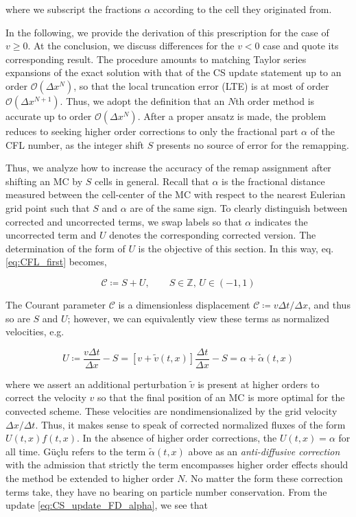 \documentclass[11pt,titlepage]{report}
\begin{document}
\noindent where we subscript the fractions $\alpha$ according to the cell they originated from. 

In the following, we provide the derivation of this prescription for the case of $v \geq 0$. At the conclusion, we discuss differences for the  $v < 0$ case and quote its corresponding result. The procedure amounts to matching Taylor series expansions of the exact solution with that of the CS update statement up to an order $\mathcal{O}(\Delta x^N)$, so that the local truncation error (LTE) is at most of order $\mathcal{O}(\Delta x^{N+1})$. Thus, we adopt the definition that an $N$th order method is accurate up to order $\mathcal{O}(\Delta x^N)$. After a proper ansatz is made, the problem reduces to seeking higher order corrections to only the fractional part $\alpha$ of the CFL number, as the integer shift $S$ presents no source of error for the remapping.

Thus, we analyze how to increase the accuracy of the remap assignment after shifting an MC by $S$ cells in general. Recall that $\alpha$ is the fractional distance measured between the cell-center of the MC with respect to the nearest Eulerian grid point such that $S$ and $\alpha$ are of the same sign. To clearly distinguish between corrected and uncorrected terms, we swap labels so that $\alpha$ indicates the uncorrected term and $U$ denotes the corresponding corrected version. The determination of the form of $U$ is the objective of this section. In this way, eq. \eqref{eq:CFL_first} becomes,

$$\mathcal{C} \coloneqq S + U, \qquad S\in\mathbb{Z},\, U\in (-1,1)$$

\noindent The Courant parameter $\mathcal{C}$ is a dimensionless displacement $\mathcal{C} \coloneqq v\Delta t / \Delta x$, and thus so are $S$ and $U$; however, we can equivalently view these terms as normalized velocities, e.g.

$$U \coloneqq \frac{v\Delta t}{\Delta x} - S = [v + \tilde{v} (t,x)]\frac{\Delta t}{\Delta x} - S = \alpha + \tilde{\alpha}(t,x)$$

\noindent where we assert an additional perturbation $\tilde{v}$ is present at higher orders to correct the velocity $v$ so that the final position of an MC is more optimal for the convected scheme. These velocities are nondimensionalized by the grid velocity $\Delta x / \Delta t$. Thus, it makes sense to speak of corrected normalized fluxes of the form $U(t,x)f(t,x)$. In the absence of higher order corrections, the  $U(t,x) = \alpha$ for all time. G\"{u}\c{c}lu refers to the term  $\tilde{\alpha}(t,x)$ above as an \emph{anti-diffusive correction} with the admission that strictly the term encompasses higher order effects should the method be extended to higher order $N$. No matter the form these correction terms take, they have no bearing on particle number conservation. From the update \eqref{eq:CS_update_FD_alpha}, we see that
\end{document}
